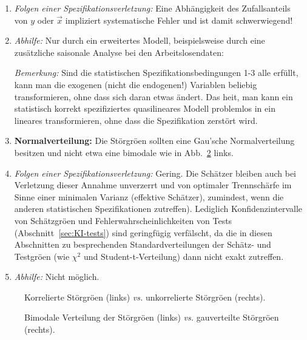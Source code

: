 \begin{enumerate}
\bi
\item \textit{Folgen einer Spezifikationsverletzung:} Eine
Abh\"angigkeit des Zufallsanteils von $y$ oder $\vec{x}$ 
 impliziert systematische Fehler und ist damit
schwerwiegend!
\item \textit{Abhilfe:} 
Nur durch ein erweitertes Modell, beispielsweise durch
eine zus\"atzliche saisonale Analyse bei den Arbeitslosendaten: 
\ei

\textit{Bemerkung:} Sind die statistischen Spezifikationsbedingungen
1-3 alle erf\"ullt, kann man die exogenen
(nicht die endogenen!) Variablen beliebig transformieren, ohne dass
sich daran etwas \"andert. Das hei\3t, man kann
ein statistisch korrekt spezifiziertes 
quasilineares Modell problemlos in ein lineares transformieren,
ohne dass die Spezifikation zerst\"ort wird.
 
\item \textbf{Normalverteilung:} Die St\"orgr\"o\3en sollten eine
Gau\3'sche Normalverteilung besitzen und nicht etwa eine bimodale wie in
Abb.~\ref{fig:statSpezGauss} links. 

\bi
\item \textit{Folgen einer Spezifikationsverletzung:} 
Gering. Die Sch\"atzer bleiben auch bei Verletzung dieser Annahme
unverzerrt und von optimaler Trennsch\"arfe im Sinne einer
minimalen Varianz (effektive Sch\"atzer), zumindest, 
wenn die anderen statistischen Spezifikationen zutreffen). 
Lediglich Konfidenzintervalle von Sch\"atzgr\"o\3en
und Fehlerwahrscheinlichkeiten von Tests (Abschnitt~\ref{sec:KI-tests})
sind geringf\"ugig
verf\"alscht, da die in diesen Abschnitten zu besprechenden 
Standardverteilungen der Sch\"atz- und Testgr\"o\3en (wie $\chi^2$ und
Student-t-Verteilung) dann nicht exakt zutreffen.
\item \textit{Abhilfe:} Nicht m\"oglich.
\ei

\end{enumerate}
\begin{figure}
\caption{\label{fig:statSpezKorr}Korrelierte St\"orgr\"o\3en (links)
\textit{vs.} unkorrelierte St\"orgr\"o\3en (rechts).
}
\end{figure}
\begin{figure}
\caption{\label{fig:statSpezGauss}Bimodale Verteilung der
St\"orgr\"o\3en (links) 
\textit{vs.} gau\3verteilte St\"orgr\"o\3en (rechts).
}
\end{figure}

